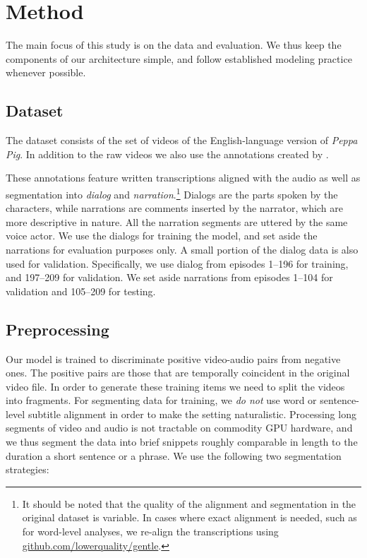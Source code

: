 \section{Method}
\label{sec:method}

The main focus of this study is on the data and evaluation. We thus
keep the components of our architecture simple, and follow established
modeling practice whenever possible.

\subsection{Dataset}
The dataset consists of the set of videos of the
English-language version of {\it Peppa Pig}. In addition to the raw
videos we  also use the annotations created by
\citet{papasarantopoulos2021narration}.

These annotations feature written transcriptions aligned with the
audio as well as segmentation into {\it dialog} and {\it
  narration}.\footnote{It should be noted that the quality of the
  alignment and segmentation in the original dataset is variable. In
  cases where exact alignment is needed, such as for word-level
  analyses, we re-align the transcriptions using
  \url{github.com/lowerquality/gentle}.}  Dialogs are the parts spoken
by the characters, while narrations are comments inserted by the
narrator, which are more descriptive in nature. All the narration
segments are uttered by the same voice actor. We use the dialogs for
training the model, and set aside the narrations for evaluation
purposes only. A small portion of the dialog data is also used for
validation.  Specifically, we use dialog from episodes 1--196 for training, and
197--209 for validation. We set aside narrations from episodes 1--104
for validation and 105--209 for testing. 


\subsection{Preprocessing}
Our model is trained to discriminate positive video-audio pairs from
negative ones.  The positive pairs are those that are temporally
coincident in the original video file. In order to generate these
training items we need to split the videos into fragments.  For
segmenting data for training, we \emph{do not} use word or
sentence-level subtitle alignment in order to make the setting
naturalistic. Processing long segments of video and audio is not
tractable on commodity GPU hardware, and we thus segment the data into
brief snippets roughly comparable in length to the duration a short
sentence or a phrase. We use the following two segmentation
strategies:

